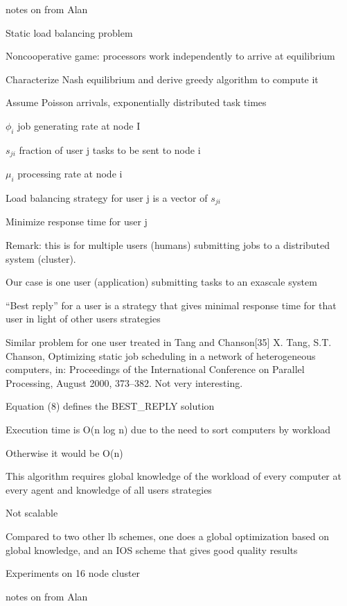 \documentclass{article}
\begin{document}
\cite{GROSU20051022}




notes on
\cite{GROSU20051022}
from Alan


Static load balancing problem

Noncooperative game: processors work independently to arrive at equilibrium

Characterize Nash equilibrium and derive greedy algorithm to compute it

Assume Poisson arrivals, exponentially distributed task times

$\phi_i$ job generating rate at node I

$s_{ji}$ fraction of user j tasks to be sent to node i

$\mu_i$ processing rate at node i 

Load balancing strategy for user j is a vector of ${ s_{ji} }$

Minimize response time for user j

Remark: this is for multiple users (humans) submitting jobs to a distributed system (cluster).

Our case is one user (application) submitting tasks to an exascale system

“Best reply” for a user is a strategy that gives minimal response time for that user in light of other users strategies

Similar problem for one user treated in Tang and Chanson[35]
X. Tang, S.T. Chanson, Optimizing static job scheduling in a network
of heterogeneous computers, in: Proceedings of the International
Conference on Parallel Processing, August 2000, 373–382. Not very interesting.

Equation (8) defines the BEST\_REPLY solution

Execution time is O(n log n) due to the need to sort computers by workload

Otherwise it would be O(n)

This algorithm requires global knowledge of the workload of every computer at every agent and knowledge of all users strategies

Not scalable

Compared to two other lb schemes, one does a global optimization based on global knowledge, and an IOS scheme that gives good quality results

Experiments on 16 node cluster


\cite{doi:10.1142/S0219198902000574}

notes on
\cite{doi:10.1142/S0219198902000574}
from Alan
\end{document}
